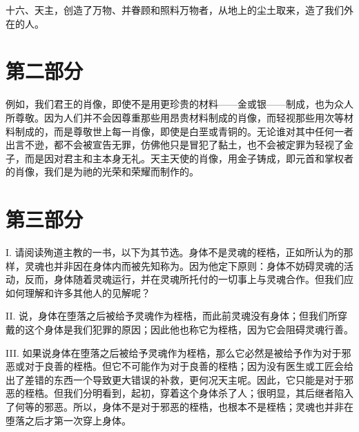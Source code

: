 十六、天主，创造了万物、并眷顾和照料万物者，从地上的尘土取来，造了我们外在的人。\par


\section{第二部分}

\par

例如，我们君王的肖像，即使不是用更珍贵的材料——金或银——制成，也为众人所尊敬。因为人们并不会因尊重那些用昂贵材料制成的肖像，而轻视那些用次等材料制成的，而是尊敬世上每一肖像，即使是白垩或青铜的。无论谁对其中任何一者出言不逊，都不会被宣告无罪，仿佛他只是冒犯了黏土，也不会被定罪为轻视了金子，而是因对君主和主本身无礼。天主天使的肖像，用金子铸成，即元首和掌权者的肖像，我们是为祂的光荣和荣耀而制作的。\par


\section{第三部分}

\par

I. 请阅读殉道主教的一书，以下为其节选。身体不是灵魂的桎梏，正如所认为的那样，灵魂也并非因在身体内而被先知称为。因为他定下原则：身体不妨碍灵魂的活动，反而，身体随着灵魂运行，并在灵魂所托付的一切事上与灵魂合作。但我们应如何理解和许多其他人的见解呢？\par

II. 说，身体在堕落之后被给予灵魂作为桎梏，而此前灵魂没有身体；但我们所穿戴的这个身体是我们犯罪的原因；因此他也称它为桎梏，因为它会阻碍灵魂行善。\par

III. 如果说身体在堕落之后被给予灵魂作为桎梏，那么它必然是被给予作为对于邪恶或对于良善的桎梏。但它不可能作为对于良善的桎梏；因为没有医生或工匠会给出了差错的东西一个导致更大错误的补救，更何况天主呢。因此，它只能是对于邪恶的桎梏。但我们分明看到，起初，穿着这个身体杀了人；很明显，其后继者陷入了何等的邪恶。所以，身体不是对于邪恶的桎梏，也根本不是桎梏；灵魂也并非在堕落之后才第一次穿上身体。\par

